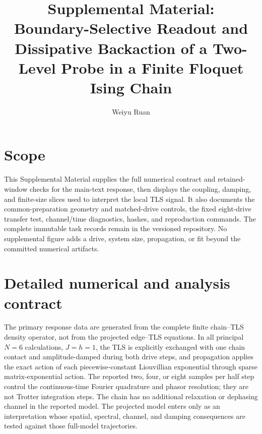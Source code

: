 \documentclass[11pt]{article}
\title{Supplemental Material:\\ Boundary-Selective Readout and Dissipative Backaction of a Two-Level Probe in a Finite Floquet Ising Chain}
\author{Weiyu Ruan}
\date{}
\begin{document}
\maketitle

\section*{Scope}

This Supplemental Material supplies the full numerical contract and retained-window checks for the main-text response, then displays the coupling, damping, and finite-size slices used to interpret the local TLS signal. It also documents the common-preparation geometry and matched-drive controls, the fixed eight-drive transfer test, channel/time diagnostics, hashes, and reproduction commands. The complete immutable task records remain in the versioned repository. No supplemental figure adds a drive, system size, propagation, or fit beyond the committed numerical artifacts.

\section{Detailed numerical and analysis contract}
\label{sec:supp-protocol}

The primary response data are generated from the complete finite chain--TLS density operator, not from the projected edge--TLS equations. In all principal $N=6$ calculations, $J=h=1$, the TLS is explicitly exchanged with one chain contact and amplitude-damped during both drive steps, and propagation applies the exact action of each piecewise-constant Liouvillian exponential through sparse matrix-exponential action. The reported two, four, or eight samples per half step control the continuous-time Fourier quadrature and phasor resolution; they are not Trotter integration steps. The chain has no additional relaxation or dephasing channel in the reported model. The projected model enters only as an interpretation whose spatial, spectral, channel, and damping consequences are tested against those full-model trajectories.
\end{document}
